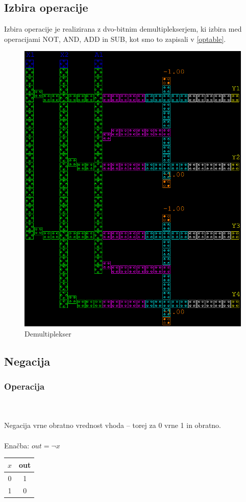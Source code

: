 \documentclass[seminar, slovene]{FRIreport}
\begin{document}
\subsection{Izbira operacije}
Izbira operacije je realizirana z dvo-bitnim demultiplekserjem, ki izbira med operacijami NOT, AND, ADD in SUB, kot smo to zapisali v \autoref{optable}.
\begin{figure}[H]
\begin{center}
\includegraphics[width=14cm]{qca/img/demux}
\caption{Demultiplekser}
\label{demux}
\end{center}
\end{figure}

\subsection{Negacija}
\subsubsection{Operacija}\ \\ \ \\
Negacija vrne obratno vrednost vhoda -- torej za 0 vrne 1 in obratno.
\ \\ \ \\
Enačba: $ out = \lnot x $
\begin{table}[H]
\begin{tabular}{ | c || c | }\hline
$x$ & out \\ \hline
0 & 1 \\
1 & 0 \\ \hline
\end{tabular}
\end{table}
\end{document}
